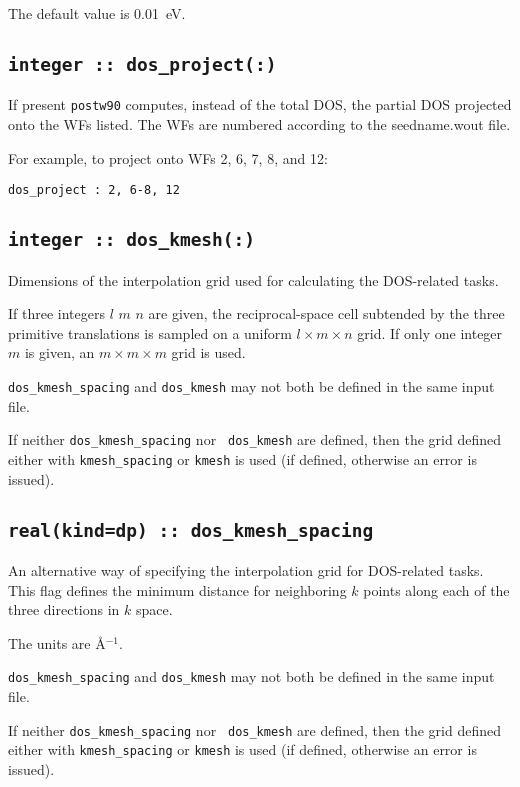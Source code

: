 The default value is 0.01~eV.

\subsection[dos\_project]{\tt integer :: dos\_project(:)}

If present {\tt postw90} computes, instead of the total DOS, the
partial DOS projected onto the WFs listed. The WFs are numbered
according to the seedname.wout file.

For example, to project onto WFs 2, 6, 7, 8, and 12:

{\tt dos\_project : 2, 6-8, 12}


\subsection[dos\_kmesh]{\tt integer :: dos\_kmesh(:)}
Dimensions of the interpolation grid used for calculating the DOS-related tasks.

If three integers $l$ $m$ $n$ are given, the reciprocal-space cell
subtended by the three primitive translations is sampled on a uniform
$l\times m\times n$ grid.  If only one integer $m$ is given, an
$m\times m\times m$ grid is used.

{\tt dos\_kmesh\_spacing} and {\tt dos\_kmesh} may not
both be defined in the same input file.

If neither {\tt dos\_kmesh\_spacing} nor {\tt
  dos\_kmesh} are defined, then the grid defined either with
{\tt kmesh\_spacing} or {\tt kmesh} is used (if defined,
otherwise an error is issued).

\subsection[dos\_kmesh\_spacing]{\tt real(kind=dp) :: dos\_kmesh\_spacing}
An alternative way of specifying the interpolation grid for
DOS-related tasks. This flag defines the minimum distance for
neighboring $k$ points along each of the three directions in $k$
space. 

The units are \AA$^{-1}$.

{\tt dos\_kmesh\_spacing} and {\tt dos\_kmesh} may
not both be defined in the same input file.

If neither {\tt dos\_kmesh\_spacing} nor {\tt
  dos\_kmesh} are defined, then the grid defined either with
{\tt kmesh\_spacing} or {\tt kmesh} is used (if defined,
otherwise an error is issued).


